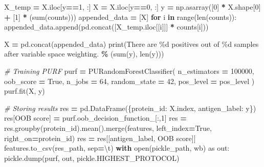 \documentclass[
  11pt,
  oneside]{book}
\newenvironment{Shaded}{\begin{snugshade}}{\end{snugshade}}
\newcommand{\BuiltInTok}[1]{#1}
\newcommand{\CharTok}[1]{\textcolor[rgb]{0.31,0.60,0.02}{#1}}
\newcommand{\CommentTok}[1]{\textcolor[rgb]{0.56,0.35,0.01}{\textit{#1}}}
\newcommand{\ControlFlowTok}[1]{\textcolor[rgb]{0.13,0.29,0.53}{\textbf{#1}}}
\newcommand{\DecValTok}[1]{\textcolor[rgb]{0.00,0.00,0.81}{#1}}
\newcommand{\ImportTok}[1]{#1}
\newcommand{\KeywordTok}[1]{\textcolor[rgb]{0.13,0.29,0.53}{\textbf{#1}}}
\newcommand{\NormalTok}[1]{#1}
\newcommand{\OperatorTok}[1]{\textcolor[rgb]{0.81,0.36,0.00}{\textbf{#1}}}
\newcommand{\SpecialCharTok}[1]{\textcolor[rgb]{0.00,0.00,0.00}{#1}}
\newcommand{\StringTok}[1]{\textcolor[rgb]{0.31,0.60,0.02}{#1}}
\newcommand{\VariableTok}[1]{\textcolor[rgb]{0.00,0.00,0.00}{#1}}
\begin{document}
\begin{Shaded}
\begin{Highlighting}[]
\NormalTok{    X\_temp }\OperatorTok{=}\NormalTok{ X.iloc[y}\OperatorTok{==}\DecValTok{1}\NormalTok{, :]}
\NormalTok{    X }\OperatorTok{=}\NormalTok{ X.iloc[y}\OperatorTok{==}\DecValTok{0}\NormalTok{, :]}
\NormalTok{    y }\OperatorTok{=}\NormalTok{ np.asarray([}\DecValTok{0}\NormalTok{] }\OperatorTok{*}\NormalTok{ X.shape[}\DecValTok{0}\NormalTok{] }\OperatorTok{+}\NormalTok{ [}\DecValTok{1}\NormalTok{] }\OperatorTok{*}\NormalTok{ (}\BuiltInTok{sum}\NormalTok{(counts)))}
\NormalTok{    appended\_data }\OperatorTok{=}\NormalTok{ [X]}
    \ControlFlowTok{for}\NormalTok{ i }\KeywordTok{in} \BuiltInTok{range}\NormalTok{(}\BuiltInTok{len}\NormalTok{(counts)):}
\NormalTok{        appended\_data.append(pd.concat([X\_temp.iloc[[i]]] }\OperatorTok{*}\NormalTok{ counts[i]))}

\NormalTok{    X }\OperatorTok{=}\NormalTok{ pd.concat(appended\_data)}
    \BuiltInTok{print}\NormalTok{(}\StringTok{\textquotesingle{}There are }\SpecialCharTok{\%d}\StringTok{ positives out of }\SpecialCharTok{\%d}\StringTok{ samples after variable space weighting.\textquotesingle{}} \OperatorTok{\%}\NormalTok{ (}\BuiltInTok{sum}\NormalTok{(y), }\BuiltInTok{len}\NormalTok{(y)))}

    \CommentTok{\# Training PURF}
\NormalTok{    purf }\OperatorTok{=}\NormalTok{ PURandomForestClassifier(}
\NormalTok{        n\_estimators }\OperatorTok{=} \DecValTok{100000}\NormalTok{,}
\NormalTok{        oob\_score }\OperatorTok{=} \VariableTok{True}\NormalTok{,}
\NormalTok{        n\_jobs }\OperatorTok{=} \DecValTok{64}\NormalTok{,}
\NormalTok{        random\_state }\OperatorTok{=} \DecValTok{42}\NormalTok{,}
\NormalTok{        pos\_level }\OperatorTok{=}\NormalTok{ pos\_level}
\NormalTok{    )}
\NormalTok{    purf.fit(X, y)}

    \CommentTok{\# Storing results}
\NormalTok{    res }\OperatorTok{=}\NormalTok{ pd.DataFrame(\{}\StringTok{\textquotesingle{}protein\_id\textquotesingle{}}\NormalTok{: X.index, }\StringTok{\textquotesingle{}antigen\_label\textquotesingle{}}\NormalTok{: y\})}
\NormalTok{    res[}\StringTok{\textquotesingle{}OOB score\textquotesingle{}}\NormalTok{] }\OperatorTok{=}\NormalTok{ purf.oob\_decision\_function\_[:,}\DecValTok{1}\NormalTok{]}
\NormalTok{    res }\OperatorTok{=}\NormalTok{ res.groupby(}\StringTok{\textquotesingle{}protein\_id\textquotesingle{}}\NormalTok{).mean().merge(features, left\_index}\OperatorTok{=}\VariableTok{True}\NormalTok{, right\_on}\OperatorTok{=}\StringTok{\textquotesingle{}protein\_id\textquotesingle{}}\NormalTok{)}
\NormalTok{    res }\OperatorTok{=}\NormalTok{ res[[}\StringTok{\textquotesingle{}antigen\_label\textquotesingle{}}\NormalTok{, }\StringTok{\textquotesingle{}OOB score\textquotesingle{}}\NormalTok{]]}
\NormalTok{    features.to\_csv(res\_path, sep}\OperatorTok{=}\StringTok{\textquotesingle{}}\CharTok{\textbackslash{}t}\StringTok{\textquotesingle{}}\NormalTok{)}
    \ControlFlowTok{with} \BuiltInTok{open}\NormalTok{(pickle\_path, }\StringTok{\textquotesingle{}wb\textquotesingle{}}\NormalTok{) }\ImportTok{as}\NormalTok{ out:}
\NormalTok{        pickle.dump(purf, out, pickle.HIGHEST\_PROTOCOL)}
\end{Highlighting}
\end{Shaded}
\end{document}
